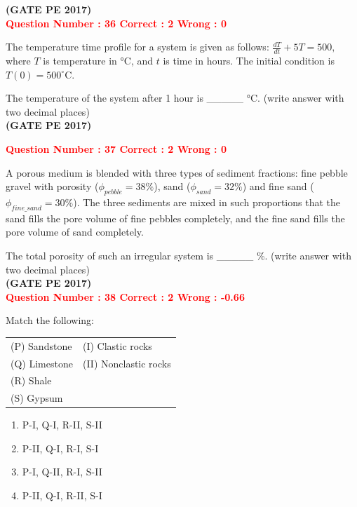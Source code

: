\documentclass[journal,12pt,onecolumn]{article}
\begin{document}
{\hfill\textbf{(GATE PE 2017)}\\[0.6cm]

\textcolor{red}{\textbf{Question Number : 36 \hfill Correct : 2  Wrong : 0}}

The temperature time profile for a system is given as follows:
{\LARGE$ 
\frac{dT}{dt} + 5T = 500,
$ }
where $T$ is temperature in °C, and $t$ is time in hours. The initial condition is $T(0) = 500^\circ$C.

The temperature of the system after 1 hour is \_\_\_\_\_ °C. (write answer with two decimal places)\\

\hfill\textbf{(GATE PE 2017)}\\[0.6cm]
\newpage

\textcolor{red}{\textbf{Question Number : 37 \hfill Correct : 2  Wrong : 0}}

A porous medium is blended with three types of sediment fractions: fine pebble gravel with porosity ($\phi_{pebble} = 38\%$), sand ($\phi_{sand} = 32\%$) and fine sand ($\phi_{fine\_sand} = 30\%$). The three sediments are mixed in such proportions that the sand fills the pore volume of fine pebbles completely, and the fine sand fills the pore volume of sand completely.

The total porosity of such an irregular system is \_\_\_\_\_ \%. (write answer with two decimal places)\\

\hfill\textbf{(GATE PE 2017)}\\[0.6cm]

\textcolor{red}{\textbf{Question Number : 38 \hfill Correct : 2  Wrong : -0.66}}

Match the following:

\begin{tabular}{ll}
(P) Sandstone & (I) Clastic rocks \\
(Q) Limestone & (II) Nonclastic rocks \\
(R) Shale & \\
(S) Gypsum & \\
\end{tabular}

\begin{enumerate}[label=(\Alph*)]
    \item P-I, Q-I, R-II, S-II \\
    \item P-II, Q-I, R-I, S-I \\
    \item P-I, Q-II, R-I, S-II \\
    \item P-II, Q-I, R-II, S-I
\end{enumerate}

}
\end{document}
